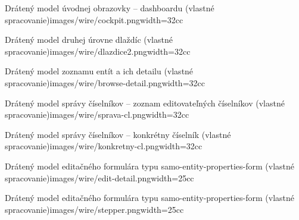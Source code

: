 {Drátený model úvodnej obrazovky -- dashboardu (vlastné spracovanie)}{images/wire/cockpit.png}{width=32cc}

{Drátený model druhej úrovne dlaždíc (vlastné spracovanie)}{images/wire/dlazdice2.png}{width=32cc}

{Drátený model zoznamu entít a ich detailu (vlastné spracovanie)}{images/wire/browse-detail.png}{width=32cc}

{Drátený model správy číselníkov -- zoznam editovateľných číselníkov (vlastné spracovanie)}{images/wire/sprava-cl.png}{width=32cc}

{Drátený model správy číselníkov -- konkrétny číselník (vlastné spracovanie)}{images/wire/konkretny-cl.png}{width=32cc}

{Drátený model editačného formulára typu samo-entity-properties-form (vlastné spracovanie)}{images/wire/edit-detail.png}{width=25cc}

{Drátený model editačného formulára typu samo-entity-properties-form (vlastné spracovanie)}{images/wire/stepper.png}{width=25cc}



\stopappendices

\stopthesis

\endinput		

Tady si můžeš psát poznámky, které se neobjeví ve výstupu.
